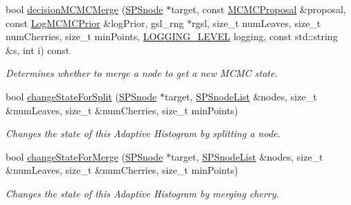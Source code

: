 \begin{DoxyCompactItemize}
bool \hyperlink{classsubpavings_1_1AdaptiveHistogram_ae2df56ec733843dffcc6af094637758d}{decision\-M\-C\-M\-C\-Merge} (\hyperlink{classsubpavings_1_1SPSnode}{\-S\-P\-Snode} $\ast$target, const \hyperlink{classsubpavings_1_1MCMCProposal}{\-M\-C\-M\-C\-Proposal} \&proposal, const \hyperlink{classsubpavings_1_1LogMCMCPrior}{\-Log\-M\-C\-M\-C\-Prior} \&log\-Prior, gsl\-\_\-rng $\ast$rgsl, size\-\_\-t num\-Leaves, size\-\_\-t num\-Cherries, size\-\_\-t min\-Points, \hyperlink{namespacesubpavings_aef8e51096b59ecaf1a1e9b2ee24b6089}{\-L\-O\-G\-G\-I\-N\-G\-\_\-\-L\-E\-V\-E\-L} logging, const std\-::string \&s, int i) const 
\begin{DoxyCompactList}\small\item\em \-Determines whether to merge a node to get a new \-M\-C\-M\-C state. \end{DoxyCompactList}\item 
bool \hyperlink{classsubpavings_1_1AdaptiveHistogram_a1544712de53718450f5f13fee5738a92}{change\-State\-For\-Split} (\hyperlink{classsubpavings_1_1SPSnode}{\-S\-P\-Snode} $\ast$target, \hyperlink{namespacesubpavings_ae7645253328c3b5fc137829039d971e3}{\-S\-P\-Snode\-List} \&nodes, size\-\_\-t \&num\-Leaves, size\-\_\-t \&num\-Cherries, size\-\_\-t min\-Points)
\begin{DoxyCompactList}\small\item\em \-Changes the state of this \-Adaptive \-Histogram by splitting a node. \end{DoxyCompactList}\item 
bool \hyperlink{classsubpavings_1_1AdaptiveHistogram_a4ff31f6b6d944c0c1e71ae4e7586cc2a}{change\-State\-For\-Merge} (\hyperlink{classsubpavings_1_1SPSnode}{\-S\-P\-Snode} $\ast$target, \hyperlink{namespacesubpavings_ae7645253328c3b5fc137829039d971e3}{\-S\-P\-Snode\-List} \&nodes, size\-\_\-t \&num\-Leaves, size\-\_\-t \&num\-Cherries, size\-\_\-t min\-Points)
\begin{DoxyCompactList}\small\item\em \-Changes the state of this \-Adaptive \-Histogram by merging cherry. \end{DoxyCompactList}\end{DoxyCompactItemize}
